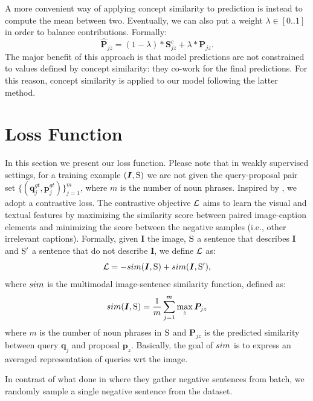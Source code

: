 A more convenient way of applying concept similarity to prediction is
instead to compute the mean between two. Eventually, we can also put a
weight $\lambda \in [0 .. 1]$ in order to balance
contributions. Formally:
\begin{equation}
  \bm{\hat{P}}_{jz} = (1 - \lambda) * \bm{S}^c_{jz} + \lambda * \bm{P}_{jz}.
\end{equation}
The major benefit of this approach is that model predictions are not
constrained to values defined by concept similarity: they co-work for
the final predictions. For this reason, concept similarity is applied
to our model following the latter method.

\section{Loss Function}
\label{sec:loss}

In this section we present our loss function. Please note that in
weakly supervised settings, for a training example $\left( \bm{I},
\mathrm{S} \right)$ we are not given the query-proposal pair set $\{ (
\bm{q}^{gt}_j, \bm{p}^{gt}_j ) \}^m_{j=1}$, where $m$ is the number of
noun phrases. Inspired by \cite{wang2020maf}, we adopt a contrastive
loss. The contrastive objective $\mathcal{L}$ aims to learn the visual and
textual features by maximizing the similarity score between paired
image-caption elements and minimizing the score between the negative
samples (i.e., other irrelevant captions). Formally, given $\bm{I}$
the image, $\mathrm{S}$ a sentence that describes $\bm{I}$ and $\mathrm{S}'$ a
sentence that do not describe $\bm{I}$, we define $\mathcal{L}$ as:
\begin{equation}
  \mathcal{L} =  - sim(\bm{I}, \mathrm{S}) + sim(\bm{I}, \mathrm{S}'),
\end{equation}
where
$sim$ is the multimodal image-sentence similarity function, defined as:
\begin{equation}
  sim(\bm{I}, \mathrm{S}) = \frac{1}{m} \sum^m_{j=1} \max_z \bm{P}_{jz}
\end{equation}
where $m$ is the number of noun phrases in $\mathrm{S}$ and $\bm{P}_{jz}$
is the predicted similarity between query $\bm{q}_j$ and proposal
$\bm{p}_z$. Basically, the goal of $sim$ is to express an averaged
representation of queries wrt the image.

In contrast of what done in \cite{wang2020maf} where they gather
negative sentences from batch, we randomly sample a single negative
sentence from the dataset.

